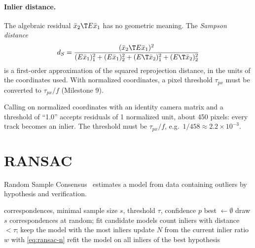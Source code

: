 \paragraph{Inlier distance.} The algebraic residual $\bar x_2\T E\bar x_1$ has no geometric meaning. The \emph{Sampson distance}
\begin{equation}
  d_S = \frac{(\bar x_2\T E\bar x_1)^2}{(E\bar x_1)_1^2 + (E\bar x_1)_2^2 + (E\T\bar x_2)_1^2 + (E\T\bar x_2)_2^2}
\end{equation}
is a first-order approximation of the squared reprojection distance, in the units of the coordinates used. With
normalized coordinates, a pixel threshold $\tau_{px}$ must be converted to $\tau_{px}/f$ (Milestone 9).

\begin{pitfall}
Calling  on normalized coordinates with an identity camera matrix and a threshold of
``1.0'' accepts residuals of 1 normalized unit, about 450 pixels: every track becomes an inlier. The threshold
must be $\tau_{px}/f$, e.g.\ $1/458 \approx 2.2\times10^{-3}$.
\end{pitfall}

\section{RANSAC}

Random Sample Consensus~\cite{fischler1981ransac} estimates a model from data containing outliers by hypothesis and
verification.

\begin{algorithm}[h]
\caption{RANSAC for relative motion}
\begin{algorithmic}[1]
\Require correspondences, minimal sample size $s$, threshold $\tau$, confidence $p$
\State best $\gets \emptyset$
  \State draw $s$ correspondences at random; fit candidate models
  \State count inliers with distance $< \tau$; keep the model with the most inliers
  \State update $N$ from the current inlier ratio $w$ with \eqref{eq:ransac-n}
\EndFor
\State refit the model on all inliers of the best hypothesis
\end{algorithmic}
\end{algorithm}

